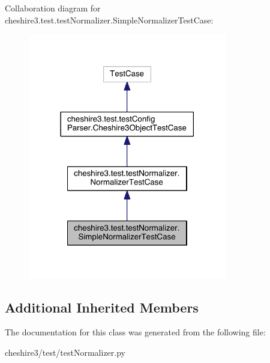 Collaboration diagram for cheshire3.\-test.\-test\-Normalizer.\-Simple\-Normalizer\-Test\-Case\-:
\nopagebreak
\begin{figure}[H]
\begin{center}
\leavevmode
\includegraphics[width=246pt]{classcheshire3_1_1test_1_1test_normalizer_1_1_simple_normalizer_test_case__coll__graph}
\end{center}
\end{figure}
\subsection*{Additional Inherited Members}


The documentation for this class was generated from the following file\-:\begin{DoxyCompactItemize}
\item 
cheshire3/test/test\-Normalizer.\-py\end{DoxyCompactItemize}
